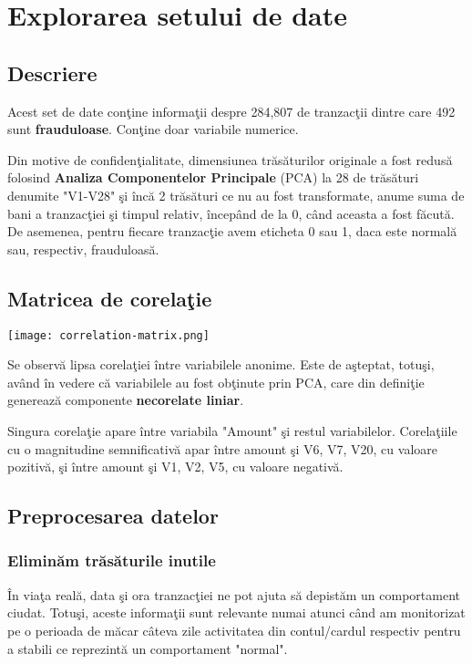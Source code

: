 \chapter{Explorarea setului de date}

\section{Descriere}

Acest set de date conţine informaţii despre 284,807 de tranzacţii dintre care 
492 sunt \textbf{frauduloase}. Conţine doar variabile numerice.

Din motive de confidenţialitate, dimensiunea trăsăturilor originale a fost 
redusă folosind \textbf{Analiza Componentelor Principale} (PCA) la 28 de trăsături denumite 
"V1-V28" şi încă 2 trăsături ce nu au fost transformate, anume suma de bani
a tranzacţiei şi timpul relativ, începând de la 0, când aceasta a fost făcută. 
De asemenea, pentru fiecare tranzacţie avem eticheta 0 sau 1, daca este normală 
sau, respectiv, frauduloasă.

\section{Matricea de corelaţie}

\texttt{[image: correlation-matrix.png]}

Se observă lipsa corelaţiei între variabilele anonime. Este de aşteptat, totuşi, 
având în vedere că variabilele au fost obţinute prin PCA, care din definiţie generează 
componente \textbf{necorelate liniar}.

Singura corelaţie apare între variabila "Amount" şi restul variabilelor. Corelaţiile
cu o magnitudine semnificativă apar între amount şi V6, V7, V20, cu valoare pozitivă, 
şi între amount şi V1, V2, V5, cu valoare negativă.

\section{Preprocesarea datelor}

\subsection{Eliminăm trăsăturile inutile}

În viaţa reală, data şi ora tranzacţiei ne pot ajuta să depistăm un comportament 
ciudat. Totuşi, aceste informaţii sunt relevante numai atunci când am monitorizat
pe o perioada de măcar câteva zile activitatea din contul/cardul respectiv pentru a 
stabili ce reprezintă un comportament "normal".

